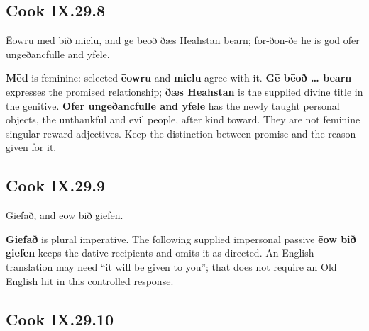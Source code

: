 \subsection*{Cook IX.29.8}

\par\begin{minipage}{\linewidth}\raggedright
Ēowru mēd bið miclu, and gē bēoð ðæs Hēahstan bearn; for-ðon-ðe hē is gōd ofer ungeðancfulle and yfele.

\textbf{Mēd} is feminine: selected \textbf{ēowru} and \textbf{miclu} agree with it. \textbf{Gē bēoð … bearn} expresses the promised relationship; \textbf{ðæs Hēahstan} is the supplied divine title in the genitive. \textbf{Ofer ungeðancfulle and yfele} has the newly taught personal objects, the unthankful and evil people, after kind toward. They are not feminine singular reward adjectives. Keep the distinction between promise and the reason given for it.

\end{minipage}\par\addvspace{4pt}

\subsection*{Cook IX.29.9}

\par\begin{minipage}{\linewidth}\raggedright
Giefað, and ēow bið giefen.

\textbf{Giefað} is plural imperative. The following supplied impersonal passive \textbf{ēow bið giefen} keeps the dative recipients and omits it as directed. An English translation may need “it will be given to you”; that does not require an Old English hit in this controlled response.

\end{minipage}\par\addvspace{4pt}

\subsection*{Cook IX.29.10}

